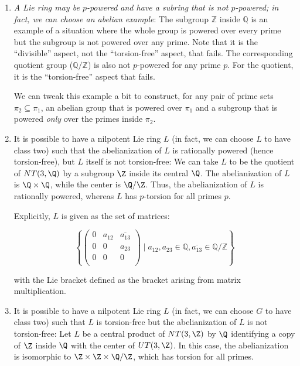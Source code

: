\documentclass{ucetd}
\begin{document}
\begin{enumerate}
\item {\em A Lie ring may be $p$-powered and have a subring that is not
  $p$-powered; in fact, we can choose an abelian example}: The
  subgroup $\mathbb{Z}$ inside $\mathbb{Q}$ is an example of a
  situation where the whole group is powered over every prime but the
  subgroup is not powered over any prime. Note that it is the
  ``divisible'' aspect, not the ``torsion-free'' aspect, that
  fails. The corresponding quotient group ($\mathbb{Q}/\mathbb{Z}$) is
  also not $p$-powered for any prime $p$. For the quotient, it is the
  ``torsion-free'' aspect that fails.

  We can tweak this example a bit to construct, for any pair of prime
  sets $\pi_2 \subseteq \pi_1$, an abelian group that is powered over
  $\pi_1$ and a subgroup that is powered {\em only} over the primes
  inside $\pi_2$.

\item It is possible to have a nilpotent Lie ring $L$ (in fact, we can
  choose $L$ to have class two) such that the abelianization of $L$ is
  rationally powered (hence torsion-free), but $L$ itself is not
  torsion-free: We can take $L$ to be the quotient of $NT(3,\Q)$ by a
  subgroup $\Z$ inside its central $\Q$. The abelianization of $L$ is
  $\Q \times \Q$, while the center is $\Q/\Z$. Thus, the
  abelianization of $L$ is rationally powered, whereas $L$ has
  $p$-torsion for all primes $p$.

  Explicitly, $L$ is given as the set of matrices:

  $$\left \{ \begin{pmatrix} 0 & a_{12} & \overline{a_{13}} \\ 0 & 0 & a_{23} \\ 0 & 0 & 0 \\\end{pmatrix} \mid a_{12},a_{23} \in \mathbb{Q}, \overline{a_{13}} \in \mathbb{Q}/\mathbb{Z} \right \}$$
    
    
    with the Lie bracket defined as the bracket arising from matrix multiplication.

\item It is possible to have a nilpotent Lie ring $L$ (in fact, we can
  choose $G$ to have class two) such that $L$ is torsion-free but the
  abelianization of $L$ is not torsion-free: Let $L$ be a central
  product of $NT(3,\Z)$ by $\Q$ identifying a copy of $\Z$ inside $\Q$
  with the center of $UT(3,\Z)$. In this case, the abelianization is
  isomorphic to $\Z \times \Z \times \Q/\Z$, which has torsion for all
  primes.


\end{enumerate}
\end{document}
